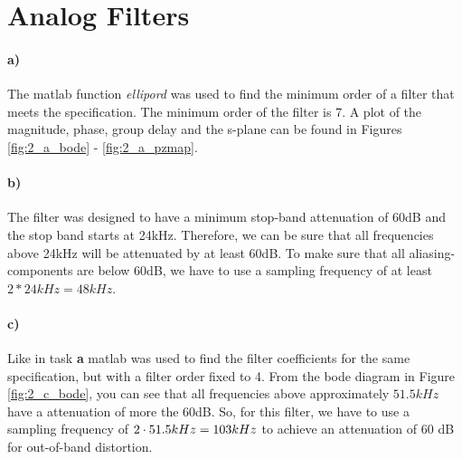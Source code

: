 \section{Analog Filters}

\paragraph{a)}
The matlab function \textit{ellipord} was used to find the minimum order of a filter that meets
the specification. The minimum order of the filter is 7. A plot of the magnitude, phase, group delay and
the s-plane can be found in Figures \ref{fig:2_a_bode} - \ref{fig:2_a_pzmap}.

\paragraph{b)}

The filter was designed to have a minimum stop-band attenuation of 60dB and the stop band starts
at 24kHz. Therefore, we can be sure that all frequencies above 24kHz will be attenuated by at least 60dB.
To make sure that all aliasing-components are below 60dB, we have to use a sampling frequency of at least
$2*24kHz = 48kHz$.

\paragraph{c)}

Like in task \textbf{a} matlab was used to find the filter coefficients for the same specification,
but with a filter order fixed to 4. From the bode diagram in Figure \ref{fig:2_c_bode}, you
can see that all frequencies above approximately $51.5 kHz$ have a attenuation of more the 60dB.
So, for this filter, we have to use a sampling frequency of $2 \cdot 51.5 kHz = 103 kHz$ to 
achieve an attenuation of 60 dB for out-of-band distortion.

